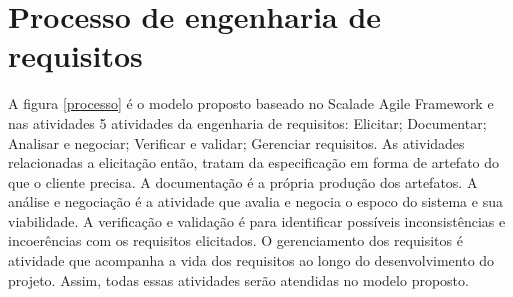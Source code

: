 \chapter[Processo de engenharia de requisitos]{Processo de engenharia de requisitos}

A figura \ref{processo} é o modelo proposto baseado no Scalade Agile Framework e nas atividades 5 atividades da engenharia de requisitos: Elicitar; Documentar; Analisar e negociar; Verificar e validar; Gerenciar requisitos. As atividades relacionadas a elicitação então, tratam da especificação em forma de artefato do que o cliente precisa. A documentação é a própria produção dos artefatos. A análise e negociação é a atividade que avalia e negocia o espoco do sistema e sua viabilidade. A verificação e validação é para identificar possíveis inconsistências e incoerências com os requisitos elicitados. O gerenciamento dos requisitos é atividade que acompanha a vida dos requisitos ao longo do desenvolvimento do projeto. Assim, todas essas atividades serão atendidas no modelo proposto.

